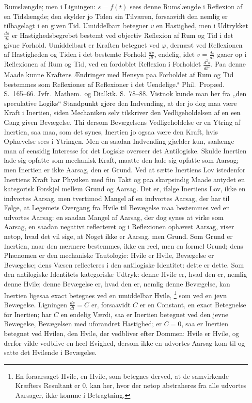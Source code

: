 \documentclass[12pt]{book}
\newcommand{\opage}[1]{\marginnote{\footnotesize\textit{[#1]}}}
\begin{document}
{  Rumslængde; men i Ligningen: $s = f(t)$ sees denne Rumslængde i Reflexion af en
  Tidslængde; den skylder jo Tiden sin Tilværen, forsaavidt den nemlig er tilbagelagt i en
  given Tid. Umiddelbart betegner $v$ en Hastighed, men i Udtrykket $\frac{ds}{dt}$ er
  Hastighedsbegrebet bestemt ved objectiv Reflexion af Rum og Tid i det givne Forhold.
  Umiddelbart er Kraften betegnet ved $\varphi$, dernæst ved Reflexionen af Hastigheden og
  Tiden i det bestemte Forhold $\frac{dv}{dt}$, endelig, idet $v = \frac{ds}{dt}$ gaaer op
  i Reflexionen af Rum og Tid, ved en fordoblet Reflexion i Forholdet $\frac{d^{2}s}{dt^{2}}$.
  Paa denne Maade kunne Kraftens Ændringer med Hensyn paa Forholdet af Rum og Tid bestemmes
  som Reflexioner af Reflexioner i det Uendelige.“ Phil.\ Propæd. S.~165--66. Jvfr.\ Mathem.\
  og Dialktk. S.~78--88.}
\opage{340} Vistnok kunde man her fra „den speculative Logiks“ Standpunkt gjøre den Indvending, at der
jo dog maa være Kraft i Inertien, siden Mechaniken selv tilskriver den Vedligeholdelsen af
en een Gang given Bevægelse. Thi dersom Bevægelsens Vedligeholdelse er en Ytring af
Inertien, saa maa, som det synes, Inertien jo ogsaa være den Kraft, hvis Ophævelse sees i
Ytringen. Men en saadan Indvending gjælder kun, saalænge man af eensidig Interesse for det
Logiske overseer det Antilogiske. Skulde Inertien lade sig opfatte som mechanisk Kraft,
maatte den lade sig opfatte som Aarsag; men Inertien er ikke Aarsag, den er Grund. Ved at
sætte Inertiens Lov istedenfor Inertiens Kraft har Physiken med fiin Takt og paa
skarpsindig Maade antydet en kategorisk Forskjel mellem Grund og Aarsag. Det er, ifølge
Inertiens Lov, ikke en indvortes Aarsag, men tvertimod Mangel af en indvortes Aarsag, der
har til Følge, at Legemets Overgang fra Hvile til Bevægelse maa bestemmes ved en udvortes
Aarsag: en saadan Mangel
\opage{341} af Aarsag, der dog synes at virke som Aarsag, en saadan negativt reflecteret og i
Reflexionen ophævet Aarsag, viser netop, hvad det vil sige, at Noget ikke er Aarsag, men
Grund. Som Grund er Inertien, naar den nærmere bestemmes, ikke en reel, men en formel
Grund; dens Phænomen er den mechaniske Tautologie: Hvile er Hvile, Bevægelse er Bevægelse;
dens Væsen reflecteres i den antilogiske Identitet: dette er dette. Som den antilogiske
Identitets kategoriske Udtryk: denne Hvile er, hvad den er, nemlig denne Hvile; denne
Bevægelse er, hvad den er, nemlig denne Bevægelse, kan Inertien ligesaa exact betegnes ved
en umiddelbar Hvile,%
\footnote{En foraarsaget Hvile, en Hvile, som betegnes derved, at de samvirkende Kræfters
  Resultant er $0$, kan her, hvor der netop abstraheres fra alle udvortes Aarsager, ikke
  komme i Betragtning.}
som ved en jevn Bevægelse. Ligningen $\frac{ds}{dt} = C$ er, forsaavidt $C$ er en
Constant, en exact Betegnelse for Inertien; har $C$ en endelig Værdi, saa er Inertien
betegnet ved den jevne Bevægelse, Bevægelsen med uforandret Hastighed; er $C = 0$, saa er
Inertien betegnet ved Hvilen, den Hvile, der vedbliver efter Dommen: Hvile er Hvile, og
derfor vilde vedblive en heel Evighed, dersom ikke en udvortes Aarsag kom til og satte det
Hvilende i Bevægelse.
\end{document}
